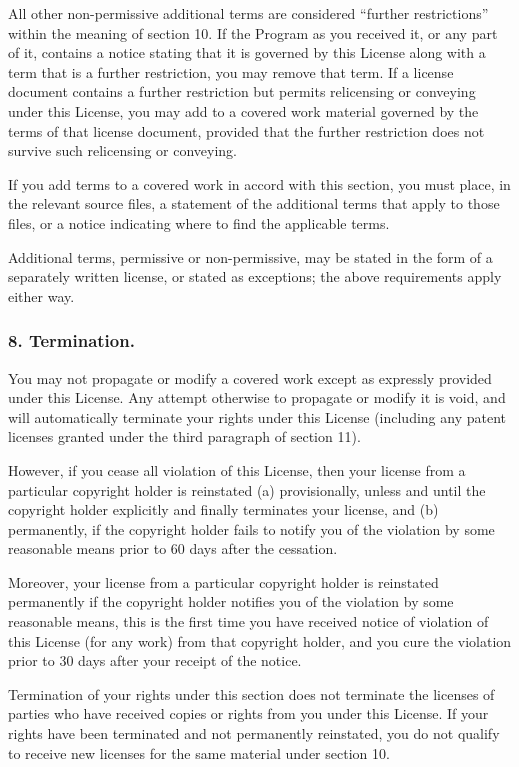 All other non-permissive additional terms are considered “further restrictions” within the meaning of section 10. If the Program as you received it, or any part of it, contains a notice stating that it is governed by this License along with a term that is a further restriction, you may remove that term. If a license document contains a further restriction but permits relicensing or conveying under this License, you may add to a covered work material governed by the terms of that license document, provided that the further restriction does not survive such relicensing or conveying.\par
If you add terms to a covered work in accord with this section, you must place, in the relevant source files, a statement of the additional terms that apply to those files, or a notice indicating where to find the applicable terms.\par
Additional terms, permissive or non-permissive, may be stated in the form of a separately written license, or stated as exceptions; the above requirements apply either way.
\subsubsection{8. Termination.}
You may not propagate or modify a covered work except as expressly provided under this License. Any attempt otherwise to propagate or modify it is void, and will automatically terminate your rights under this License (including any patent licenses granted under the third paragraph of section 11).\par
However, if you cease all violation of this License, then your license from a particular copyright holder is reinstated (a) provisionally, unless and until the copyright holder explicitly and finally terminates your license, and (b) permanently, if the copyright holder fails to notify you of the violation by some reasonable means prior to 60 days after the cessation.\par
Moreover, your license from a particular copyright holder is reinstated permanently if the copyright holder notifies you of the violation by some reasonable means, this is the first time you have received notice of violation of this License (for any work) from that copyright holder, and you cure the violation prior to 30 days after your receipt of the notice.\par
Termination of your rights under this section does not terminate the licenses of parties who have received copies or rights from you under this License. If your rights have been terminated and not permanently reinstated, you do not qualify to receive new licenses for the same material under section 10.
